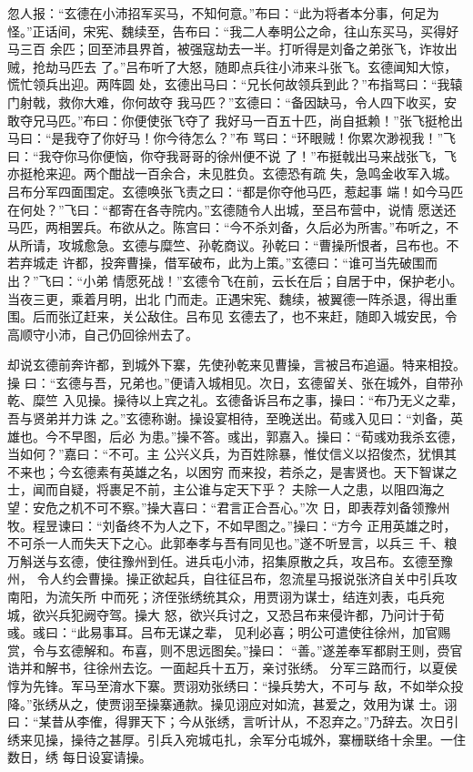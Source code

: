忽人报：“玄德在小沛招军买马，不知何意。”布曰：“此为将者本分事，何足为
怪。”正话间，宋宪、魏续至，告布曰：“我二人奉明公之命，往山东买马，买得好马三百
余匹；回至沛县界首，被强寇劫去一半。打听得是刘备之弟张飞，诈妆出贼，抢劫马匹去
了。”吕布听了大怒，随即点兵往小沛来斗张飞。玄德闻知大惊，慌忙领兵出迎。两阵圆
处，玄德出马曰：“兄长何故领兵到此？”布指骂曰：“我辕门射戟，救你大难，你何故夺
我马匹？”玄德曰：“备因缺马，令人四下收买，安敢夺兄马匹。”布曰：你便使张飞夺了
我好马一百五十匹，尚自抵赖！”张飞挺枪出马曰：“是我夺了你好马！你今待怎么？”布
骂曰：“环眼贼！你累次渺视我！”飞曰：“我夺你马你便恼，你夺我哥哥的徐州便不说
了！”布挺戟出马来战张飞，飞亦挺枪来迎。两个酣战一百余合，未见胜负。玄德恐有疏
失，急鸣金收军入城。吕布分军四面围定。玄德唤张飞责之曰：“都是你夺他马匹，惹起事
端！如今马匹在何处？”飞曰：“都寄在各寺院内。”玄德随令人出城，至吕布营中，说情
愿送还马匹，两相罢兵。布欲从之。陈宫曰：“今不杀刘备，久后必为所害。”布听之，不
从所请，攻城愈急。玄德与糜竺、孙乾商议。孙乾曰：“曹操所恨者，吕布也。不若弃城走
许都，投奔曹操，借军破布，此为上策。”玄德曰：“谁可当先破围而出？”飞曰：“小弟
情愿死战！”玄德令飞在前，云长在后；自居于中，保护老小。当夜三更，乘着月明，出北
门而走。正遇宋宪、魏续，被翼德一阵杀退，得出重围。后而张辽赶来，关公敌住。吕布见
玄德去了，也不来赶，随即入城安民，令高顺守小沛，自己仍回徐州去了。

却说玄德前奔许都，到城外下寨，先使孙乾来见曹操，言被吕布追逼。特来相投。操
曰：“玄德与吾，兄弟也。”便请入城相见。次日，玄德留关、张在城外，自带孙乾、糜竺
入见操。操待以上宾之礼。玄德备诉吕布之事，操曰：“布乃无义之辈，吾与贤弟并力诛
之。”玄德称谢。操设宴相待，至晚送出。荀彧入见曰：“刘备，英雄也。今不早图，后必
为患。”操不答。彧出，郭嘉入。操曰：“荀彧劝我杀玄德，当如何？”嘉曰：“不可。主
公兴义兵，为百姓除暴，惟仗信义以招俊杰，犹惧其不来也；今玄德素有英雄之名，以困穷
而来投，若杀之，是害贤也。天下智谋之士，闻而自疑，将裹足不前，主公谁与定天下乎？
夫除一人之患，以阻四海之望：安危之机不可不察。”操大喜曰：“君言正合吾心。”次
日，即表荐刘备领豫州牧。程昱谏曰：“刘备终不为人之下，不如早图之。”操曰：“方今
正用英雄之时，不可杀一人而失天下之心。此郭奉孝与吾有同见也。”遂不听昱言，以兵三
千、粮万斛送与玄德，使往豫州到任。进兵屯小沛，招集原散之兵，攻吕布。玄德至豫州，
令人约会曹操。操正欲起兵，自往征吕布，忽流星马报说张济自关中引兵攻南阳，为流矢所
中而死；济侄张绣统其众，用贾诩为谋士，结连刘表，屯兵宛城，欲兴兵犯阙夺驾。操大
怒，欲兴兵讨之，又恐吕布来侵许都，乃问计于荀彧。彧曰：“此易事耳。吕布无谋之辈，
见利必喜；明公可遣使往徐州，加官赐赏，令与玄德解和。布喜，则不思远图矣。”操曰：
“善。”遂差奉军都尉王则，赍官诰并和解书，往徐州去讫。一面起兵十五万，亲讨张绣。
分军三路而行，以夏侯惇为先锋。军马至淯水下寨。贾诩劝张绣曰：“操兵势大，不可与
敌，不如举众投降。”张绣从之，使贾诩至操寨通款。操见诩应对如流，甚爱之，效用为谋
士。诩曰：“某昔从李傕，得罪天下；今从张绣，言听计从，不忍弃之。”乃辞去。次日引
绣来见操，操待之甚厚。引兵入宛城屯扎，余军分屯城外，寨栅联络十余里。一住数日，绣
每日设宴请操。

